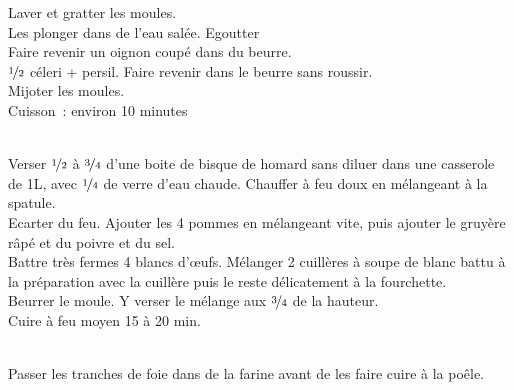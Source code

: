 \begin{minipage}[c]{\textwidth}
Laver et gratter les moules.\\
Les plonger dans de l’eau salée. Egoutter \\
Faire revenir un oignon coupé dans du beurre. \\
$\nicefrac{1}{2}$ céleri + persil. Faire revenir dans le beurre sans roussir. \\
Mijoter les moules. \\
Cuisson : environ 10 minutes\\
\\

\end{minipage}

\begin{minipage}[c]{\textwidth}
Verser $\nicefrac{1}{2}$ à $\nicefrac{3}{4}$ d’une boite de bisque de homard sans diluer dans une casserole de 1L, avec $\nicefrac{1}{4}$ de verre d’eau chaude. Chauffer à feu doux en mélangeant à la spatule. \\
Ecarter du feu. Ajouter les 4 pommes en mélangeant vite, puis ajouter le gruyère râpé et du poivre et du sel. \\
Battre très fermes 4 blancs d’œufs. Mélanger 2 cuillères à soupe de blanc battu à la préparation avec la cuillère puis le reste délicatement à la fourchette. \\
Beurrer le moule. Y verser le mélange aux $\nicefrac{3}{4}$ de la hauteur. \\
Cuire à feu moyen 15 à 20 min. \\
\\

\end{minipage}

\begin{minipage}[c]{\textwidth}
Passer les tranches de foie dans de la farine avant de les faire cuire à la poêle. \\
\\

\end{minipage}

